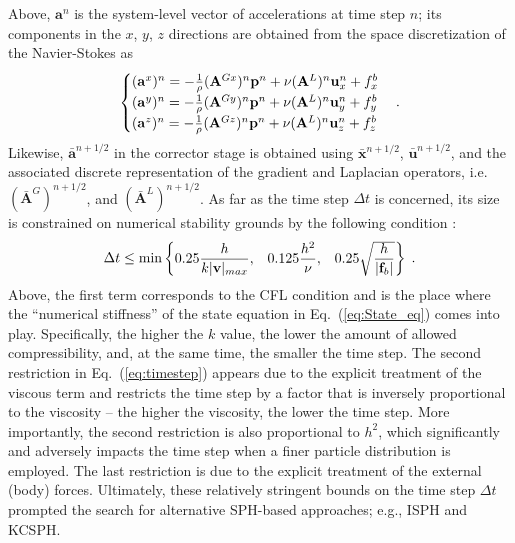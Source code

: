 Above, $\mathbf{a}^n$ is the system-level vector of accelerations at time step $n$; its components in the $x$, $y$, $z$ directions are obtained from the space discretization of the Navier-Stokes as   
\begin{align*}
\begin{cases}
(\mathbf{a}^x)^n=  -\frac{1}{\rho} (\mathbf{A}^{Gx})^n\mathbf{p}^n + \nu (\mathbf{A}^L)^n{\bf u}^n_x+{ f}_x^b\\
(\mathbf{a}^y)^n=  -\frac{1}{\rho} (\mathbf{A}^{Gy})^n\mathbf{p}^n + \nu (\mathbf{A}^L)^n{\bf u}^n_y+{ f}_y^b\\
(\mathbf{a}^z)^n=  -\frac{1}{\rho} (\mathbf{A}^{Gz})^n\mathbf{p}^n + \nu (\mathbf{A}^L)^n{\bf u}^n_z+{ f}_z^b
\end{cases} .
\end{align*}
Likewise, ${\bar{\mathbf{a}}}^{n+1/2}$ in the corrector stage is obtained using ${\bar{\mathbf{x}}}^{n+1/2}$, ${\bar{\mathbf{u}}}^{n+1/2}$, and the associated discrete representation of the gradient and Laplacian operators, i.e. $({\bar{\mathbf{A}}}^G)^{n+1/2}$, and $({\bar{\mathbf{A}}}^L)^{n+1/2}$. As far as the time step $\Delta t$ is concerned, its size is constrained on numerical stability grounds by the following condition \cite{liu2003smoothed}:
\begin{align}\label{eq:timestep}
\Delta t \leq \text{min} \begin{Bmatrix}
0.25 \dfrac{h}{k| {\bf v}|_{max}},& 0.125 \dfrac{h^2}{\nu}, & 0.25 \sqrt{\dfrac{h}{|\mathbf{f}_b|}}\end{Bmatrix} \; .
\end{align}
Above, the first term corresponds to the CFL condition and is the place where the ``numerical stiffness'' of the state equation in Eq.~(\ref{eq:State_eq}) comes into play. Specifically, the higher the $k$ value, the lower the amount of allowed compressibility, and, at the same time, the smaller the time step. The second restriction in Eq.~(\ref{eq:timestep}) appears due to the explicit treatment of the viscous term and restricts the time step by a factor that is inversely proportional to the viscosity -- the higher the viscosity, the lower the time step. More importantly, the second restriction is also proportional to $h^2$, which significantly and adversely impacts the time step when a finer particle distribution is employed. The last restriction is due to the explicit treatment of the external (body) forces. Ultimately, these relatively stringent bounds on the time step $\Delta t$ prompted the search for alternative SPH-based approaches; e.g., ISPH and KCSPH.

